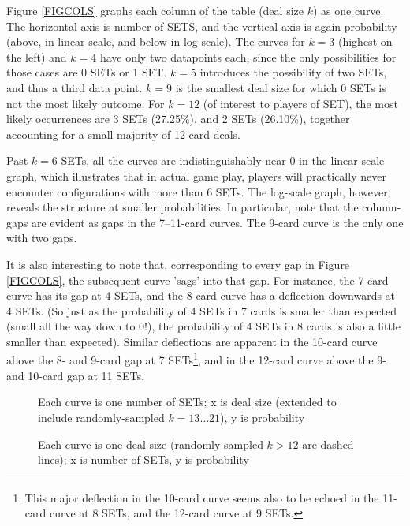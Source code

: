 \documentclass[10pt]{amsart}
\newcommand{\SET}{SET\texttrademark}  %
\begin{document}
Figure \ref{FIGCOLS} graphs each column of the table (deal size $k$) as one
curve. The horizontal axis is number of SETS, and the vertical axis is again
probability (above, in linear scale, and below in log scale). The curves for
$k=3$ (highest on the left) and $k=4$ have only two datapoints each, since the
only possibilities for those cases are 0 SETs or 1 SET. $k=5$ introduces the
possibility of two SETs, and thus a third data point. $k=9$ is the smallest deal
size for which 0 SETs is not the most likely outcome. For $k=12$ (of interest to
players of \SET), the most likely occurrences are 3 SETs (27.25\%), and 2 SETs
(26.10\%), together accounting for a small majority of 12-card deals.

Past $k=6$ SETs, all the curves are indistinguishably near 0 in the linear-scale
graph, which illustrates that in actual game play, players will practically
never encounter configurations with more than 6 SETs. The log-scale graph,
however, reveals the structure at smaller probabilities. In particular, note
that the column-gaps are evident as gaps in the 7--11-card curves. The 9-card
curve is the only one with two gaps.

It is also interesting to note that, corresponding to every gap in Figure
\ref{FIGCOLS}, the subsequent curve 'sags' into that gap. For instance, the
7-card curve has its gap at 4 SETs, and the 8-card curve has a deflection
downwards at 4 SETs. (So just as the probability of 4 SETs in 7 cards is smaller
than expected (small all the way down to 0!), the probability of 4 SETs in 8
cards is also a little smaller than expected). Similar deflections are apparent
in the 10-card curve above the 8- and 9-card gap at 7 SETs\footnote{This major
  deflection in the 10-card curve seems also to be echoed in the 11-card curve
  at 8 SETs, and the 12-card curve at 9 SETs.}, and in the 12-card curve above
the 9- and 10-card gap at 11 SETs.

\begin{figure}[!htb]
  \caption{\label{FIGROWSFULL} Each curve is one number of SETs; x is deal size
    (extended to include randomly-sampled $k=13\ldots 21$), y is probability}
\end{figure}

\begin{figure}[!htb]
  \caption{\label{FIGCOLSFULL} Each curve is one deal size (randomly sampled $k>12$
    are dashed lines); x is number of SETs, y is probability}
\end{figure}
\end{document}
